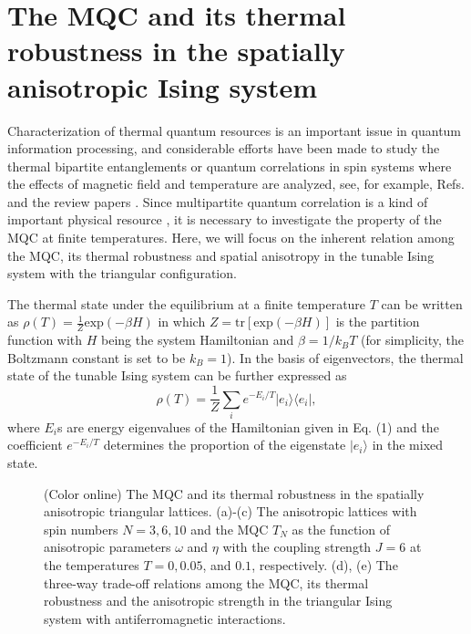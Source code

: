 \documentclass[pra,aps,twocolumn,showpacs]{revtex4}
\newcommand{\ket}[1]{|#1\rangle}
\newcommand{\bra}[1]{\langle #1|}
\begin{document}
\section{The MQC and its thermal robustness in the spatially anisotropic Ising system}

Characterization of thermal quantum resources is an important issue in quantum information processing, and considerable efforts have been made to study the thermal bipartite entanglements or quantum correlations in spin systems where the effects of magnetic field and temperature are analyzed, see, for example, Refs. \cite{wang01pla,kamta02prl,zhou03pra,zhang05pra,arnesen01prl,wang01pra,wang02pra,sun05njp,abliz06pra,ww06pra,hide09prl,park17prl,Shim08prb} and the review papers \cite{amico08rmp,bera18rpp}. Since multipartite quantum correlation is a kind of important physical resource \cite{vedral04njp,Nakata09pra,Campbell13njp,sun19pra}, it is necessary to investigate the property of the MQC at finite temperatures. Here, we will focus on the inherent relation among the MQC, its thermal robustness and spatial anisotropy in the tunable Ising system with the triangular configuration.


The thermal state under the equilibrium at a finite temperature $T$ can be written as \cite{sach99book} $\rho(T)=\frac{1}{Z} \mbox{exp}(-\beta H)$ in which $Z=\mbox{tr}[\mbox{exp}(-\beta H)]$ is the partition function with $H$ being the system Hamiltonian and  $\beta=1/k_{B}T$ (for simplicity, the Boltzmann constant is set to be $k_B=1$). In the basis of eigenvectors, the thermal state of the tunable Ising system can be further expressed as
\begin{equation}
\rho(T)=\frac{1}{Z} \sum_{i}e^{-E_i/T}\ket{e_{i}}\bra{e_{i}},
\end{equation}
where $E_i$s are energy eigenvalues of the Hamiltonian given in Eq. (1) and the coefficient $e^{-E_i/T}$ determines the proportion of the eigenstate $\ket{e_i}$ in the mixed state.

\begin{figure}
	\caption{(Color online) The MQC and its thermal robustness in the spatially anisotropic triangular lattices. (a)-(c) The anisotropic lattices with spin numbers $N=3, 6, 10$ and the MQC $T_N$ as the function of anisotropic parameters $\omega$ and $\eta$ with the coupling strength $J=6$ at the temperatures $T=0, 0.05$, and $0.1$, respectively. (d), (e) The three-way trade-off relations among the MQC, its thermal robustness and the anisotropic strength in the triangular Ising system with antiferromagnetic interactions.}
\end{figure}
\end{document}
